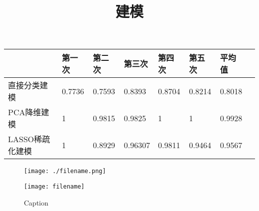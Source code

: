 \documentclass[tp12]{ctexart}
\title{建模}
\author{}
\date{}
\begin{document}
\maketitle

%


\begin{center}

    \begin{tabular}{l l l l l l l l}
    \hline
    ~&第一次&第二次&第三次&第四次&第五次&平均值\\
    \hline
    直接分类建模&0.7736&0.7593&0.8393&0.8704&0.8214&0.8018\\
    PCA降维建模&1&0.9815&0.9825&1&1&0.9928\\
    LASSO稀疏化建模&1&0.8929&0.96307&0.9811&0.9464&0.9567\\
    \hline
    \end{tabular}

\end{center}

    \begin{figure}
    \centering
    \texttt{[image: ./filename.png]}
    
    \texttt{[image: filename]}

    \caption{Caption}
    \label{}
    \end{figure}
\end{document}
